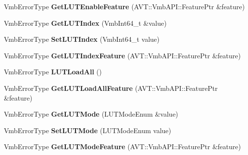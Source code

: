 \begin{DoxyCompactItemize}
\item 
\hypertarget{classMakoCamera_af007d5e0a8f3b669d45a2b708891dae7}{Vmb\-Error\-Type {\bfseries Get\-L\-U\-T\-Enable\-Feature} (A\-V\-T\-::\-Vmb\-A\-P\-I\-::\-Feature\-Ptr \&feature)}\label{classMakoCamera_af007d5e0a8f3b669d45a2b708891dae7}

\item 
\hypertarget{classMakoCamera_a47cf280ff46f894cfce4d829ea79c20c}{Vmb\-Error\-Type {\bfseries Get\-L\-U\-T\-Index} (Vmb\-Int64\-\_\-t \&value)}\label{classMakoCamera_a47cf280ff46f894cfce4d829ea79c20c}

\item 
\hypertarget{classMakoCamera_a8ac911eae028476e4a793d7c7dde8149}{Vmb\-Error\-Type {\bfseries Set\-L\-U\-T\-Index} (Vmb\-Int64\-\_\-t value)}\label{classMakoCamera_a8ac911eae028476e4a793d7c7dde8149}

\item 
\hypertarget{classMakoCamera_ab1c6dad0c5b3b1069da59b0be3c2c1e9}{Vmb\-Error\-Type {\bfseries Get\-L\-U\-T\-Index\-Feature} (A\-V\-T\-::\-Vmb\-A\-P\-I\-::\-Feature\-Ptr \&feature)}\label{classMakoCamera_ab1c6dad0c5b3b1069da59b0be3c2c1e9}

\item 
\hypertarget{classMakoCamera_a322346407bfd69c21fce31d6f8db9c8e}{Vmb\-Error\-Type {\bfseries L\-U\-T\-Load\-All} ()}\label{classMakoCamera_a322346407bfd69c21fce31d6f8db9c8e}

\item 
\hypertarget{classMakoCamera_a4d4ceebe410ba05a04f1a81e89b4c65d}{Vmb\-Error\-Type {\bfseries Get\-L\-U\-T\-Load\-All\-Feature} (A\-V\-T\-::\-Vmb\-A\-P\-I\-::\-Feature\-Ptr \&feature)}\label{classMakoCamera_a4d4ceebe410ba05a04f1a81e89b4c65d}

\item 
\hypertarget{classMakoCamera_a556d75ed82c3ac68b14796028b0b26c7}{Vmb\-Error\-Type {\bfseries Get\-L\-U\-T\-Mode} (L\-U\-T\-Mode\-Enum \&value)}\label{classMakoCamera_a556d75ed82c3ac68b14796028b0b26c7}

\item 
\hypertarget{classMakoCamera_af56e341caea80c9983380e43c055f37a}{Vmb\-Error\-Type {\bfseries Set\-L\-U\-T\-Mode} (L\-U\-T\-Mode\-Enum value)}\label{classMakoCamera_af56e341caea80c9983380e43c055f37a}

\item 
\hypertarget{classMakoCamera_af43d936f5f072963d0ce3363f25c93b5}{Vmb\-Error\-Type {\bfseries Get\-L\-U\-T\-Mode\-Feature} (A\-V\-T\-::\-Vmb\-A\-P\-I\-::\-Feature\-Ptr \&feature)}\label{classMakoCamera_af43d936f5f072963d0ce3363f25c93b5}


\end{DoxyCompactItemize}
